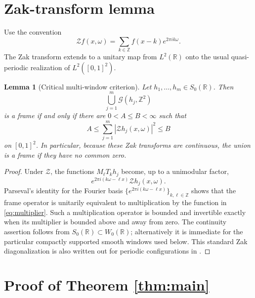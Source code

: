 \documentclass[11pt]{article}
\newtheorem{lemma}[theorem]{Lemma}
\newcommand{\R}{\mathbb R}
\newcommand{\Z}{\mathbb Z}
\newcommand{\cG}{\mathcal G}
\newcommand{\cZ}{\mathcal Z}
\newcommand{\T}{T}
\newcommand{\M}{M}
\begin{document}
\section{Zak-transform lemma}

Use the convention
\begin{equation}\label{eq:zak}
 \cZ f(x,\omega)=\sum_{k\in\Z}f(x-k)e^{2\pi i k\omega}.
\end{equation}
The Zak transform extends to a unitary map from $L^2(\R)$ onto the usual
quasi-periodic realization of $L^2([0,1]^2)$.

\begin{lemma}[Critical multi-window criterion]\label{lem:zak}
Let $h_1,\ldots,h_m\in S_0(\R)$.  Then
\[
 \bigcup_{j=1}^m\cG(h_j,\Z^2)
\]
is a frame if and only if there are $0<A\leq B<\infty$ such that
\begin{equation}\label{eq:multiplier}
 A\leq\sum_{j=1}^m|\cZ h_j(x,\omega)|^2\leq B
\end{equation}
on $[0,1]^2$.  In particular, because these Zak transforms are continuous,
the union is a frame if they have no common zero.
\end{lemma}

\begin{proof}
Under $\cZ$, the functions $\M_\ell\T_kh_j$ become, up to a unimodular
factor,
\[
 e^{2\pi i(k\omega-\ell x)}\cZ h_j(x,\omega).
\]
Parseval's identity for the Fourier basis
$\{e^{2\pi i(k\omega-\ell x)}\}_{k,\ell\in\Z}$ shows that the frame
operator is unitarily equivalent to multiplication by the function in
\eqref{eq:multiplier}.  Such a multiplication operator is bounded and
invertible exactly when its multiplier is bounded above and away from zero.
The continuity assertion follows from $S_0(\R)\subset W_0(\R)$; alternatively
it is immediate for the particular compactly supported smooth windows used
below.  This standard Zak diagonalization is also written out for periodic
configurations in \cite{Faulhuber2025}.
\end{proof}

\section{Proof of Theorem \ref{thm:main}}
\end{document}
